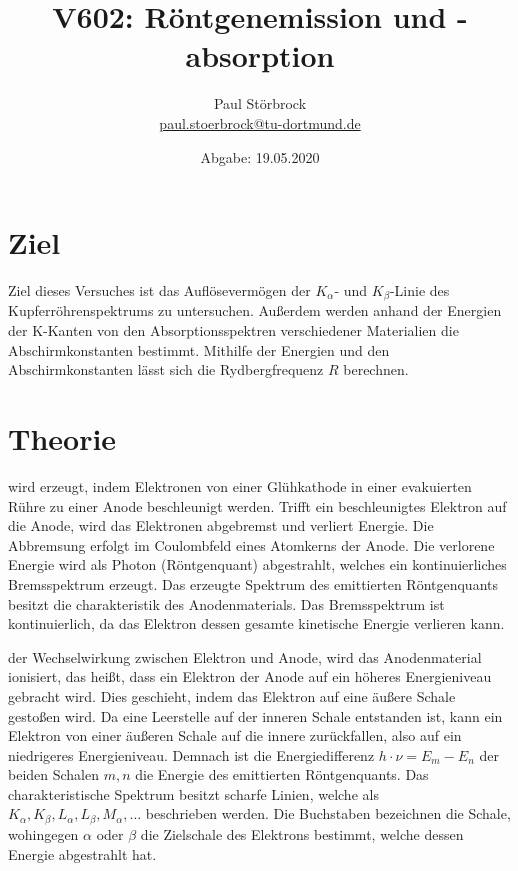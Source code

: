 
\usepackage{tikz}

\newcommand*\circled[1]{\tikz[baseline=(char.base)]{
            \node[shape=circle,draw,inner sep=2pt] (char) {#1};}}


    \title{V602: Röntgenemission und -absorption}
    \author{  
    Paul Störbrock\\
    \texorpdfstring{\href{mailto:paul.stoerbrock@tu-dortmund.de}{paul.stoerbrock@tu-dortmund.de}}{}
    }
    \date{Abgabe: 19.05.2020\vspace{-4ex}}
\maketitle
    
\newpage
\tableofcontents
\newpage

\setcounter{page}{1}

\section{Ziel}

\justifying Ziel dieses Versuches ist das Auflösevermögen der $K_{\alpha}$- und $K_{\beta}$-Linie des Kupferröhrenspektrums
zu untersuchen. Außerdem werden anhand der Energien der K-Kanten von den Absorptionsspektren verschiedener Materialien die Abschirmkonstanten bestimmt. 
Mithilfe der Energien und den Abschirmkonstanten lässt sich die Rydbergfrequenz $R$ berechnen. 

\section{Theorie}

\justifying wird erzeugt, indem Elektronen von einer Glühkathode in einer evakuierten Rühre zu einer
Anode beschleunigt werden. Trifft ein beschleunigtes Elektron auf die Anode, wird das Elektronen abgebremst und verliert Energie. Die Abbremsung
erfolgt im Coulombfeld eines Atomkerns der Anode. Die verlorene Energie wird als Photon (Röntgenquant) abgestrahlt, welches ein kontinuierliches 
Bremsspektrum erzeugt. Das erzeugte Spektrum des emittierten Röntgenquants besitzt die charakteristik des Anodenmaterials. Das Bremsspektrum ist 
kontinuierlich, da das Elektron dessen gesamte kinetische Energie verlieren kann. 

\justifying der Wechselwirkung zwischen Elektron und Anode, wird das Anodenmaterial ionisiert, das heißt, dass ein Elektron der
Anode auf ein höheres Energieniveau gebracht wird. Dies geschieht, indem das Elektron auf eine äußere Schale gestoßen wird. Da eine Leerstelle auf der
inneren Schale entstanden ist, kann ein Elektron von einer äußeren Schale auf die innere zurückfallen, also auf ein niedrigeres Energieniveau.
Demnach ist die Energiedifferenz $h\cdot\nu=E_m - E_n$ \cite{V602} der beiden Schalen $m,n$ die Energie des emittierten Röntgenquants. 
Das charakteristische Spektrum besitzt scharfe Linien, welche als $K_{\alpha}, K_{\beta}, L_{\alpha}, L_{\beta}, M_{\alpha},...$ beschrieben werden. 
Die Buchstaben bezeichnen die Schale, wohingegen $\alpha$ oder $\beta$ die Zielschale des Elektrons bestimmt, welche dessen Energie abgestrahlt 
hat. 

